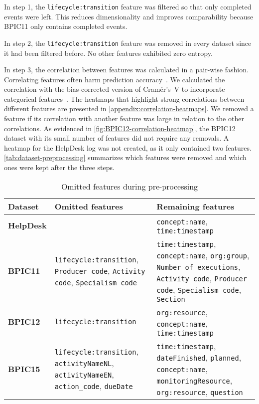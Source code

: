 In step 1, the \verb=lifecycle:transition= feature was filtered so that only completed events were left. This reduces dimensionality and improves comparability because BPIC11 only contains completed events.

In step 2, the \verb=lifecycle:transition= feature was removed in every dataset since it had been filtered before. No other features exhibited zero entropy.

In step 3, the correlation between features was calculated in a pair-wise fashion.
Correlating features often harm prediction accuracy~\cite{kuhn2013applied}.
We calculated the correlation with the bias-corrected version of Cramér's~V to incorporate categorical features~\cite{bergsma2013bias}.
The heatmaps that highlight strong correlations between different features are presented in \autoref{appendix:correlation-heatmaps}.
We removed a feature if its correlation with another feature was large in relation to the other correlations.
As evidenced in \autoref{fig:BPIC12-correlation-heatmap}, the BPIC12 dataset with its small number of features did not require any removals.
A heatmap for the HelpDesk log was not created, as it only contained two features.
\autoref{tab:dataset-preprocessing} summarizes which features were removed and which ones were kept after the three steps.

\begin{table}[!htb]
\centering
\begin{adjustbox}{center}
\begin{tabular}{lp{5cm}p{5cm}}
\textbf{Dataset} & \textbf{Omitted features} & \textbf{Remaining features}\\
\midrule
\midrule
\textbf{HelpDesk} &  & \verb=concept:name=, \verb=time:timestamp=\\
\hline
\textbf{BPIC11} & \verb=lifecycle:transition=, \verb=Producer code=,  \verb=Activity code=,  \verb=Specialism code= & \verb=time:timestamp=, \verb=concept:name=, \verb=org:group=, \verb=Number of executions=, \verb=Activity code=, \verb=Producer code=, \verb=Specialism code=, \verb=Section=\\
\hline
\textbf{BPIC12} & \verb=lifecycle:transition= & \verb=org:resource=, \verb=concept:name=, \verb=time:timestamp=\\
\hline
\textbf{BPIC15} & \verb=lifecycle:transition=, \verb=activityNameNL=, \verb=activityNameEN=, \verb=action_code=, \verb=dueDate= & \verb=time:timestamp=, \verb=dateFinished=, \verb=planned=, \verb=concept:name=, \verb=monitoringResource=, \verb=org:resource=,     \verb=question=
\end{tabular}
\end{adjustbox}
\caption{Omitted features during pre-processing}
\label{tab:dataset-preprocessing}
\end{table}

